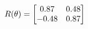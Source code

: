 \documentclass[preview]{standalone}
\begin{document}
\begin{align*}
\special{dvisvgm:raw <g id='unique000'>}R(\theta) = \begin{bmatrix}0.87 & 0.48\\-0.48 & 0.87\end{bmatrix}\special{dvisvgm:raw </g>}
\end{align*}
\end{document}

